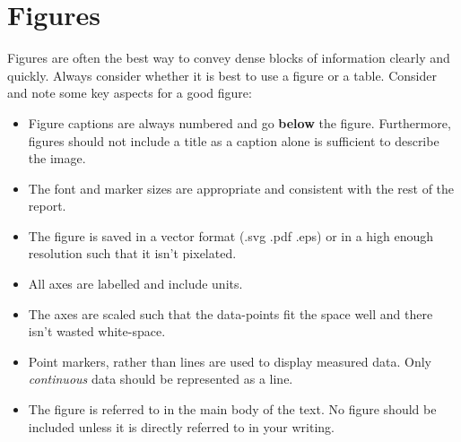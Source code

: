 \documentclass[draft,article]{UsydReport}
\begin{document}
\section{Figures}
Figures are often the best way to convey dense blocks of information clearly and quickly. Always consider whether it is best to use a figure or a table. Consider  and note some key aspects for a good figure:
\begin{itemize}
    \item Figure captions are always numbered and go \textbf{below} the figure. Furthermore, figures should not include a title as a caption alone is sufficient to describe the image.
    \item The font and marker sizes are appropriate and consistent with the rest of the report.
    \item The figure is saved in a vector format (.svg .pdf .eps) or in a high enough resolution such that it isn't pixelated.
    \item All axes are labelled and include units.
    \item The axes are scaled such that the data-points fit the space well and there isn't wasted white-space.
    \item Point markers, rather than lines are used to display measured data. Only \textit{continuous} data should be represented as a line.
    \item The figure is referred to in the main body of the text. No figure should be included unless it is directly referred to in your writing.
\end{itemize}
\end{document}
